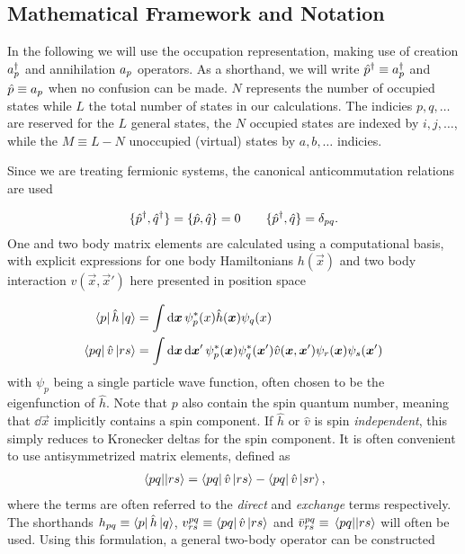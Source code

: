 \subsection{Mathematical Framework and Notation}
In the following we will use the occupation representation, making use of creation $a^{\dagger}_{p}$ and annihilation $a_{p}$ operators. As a shorthand, we will write $\hat{p}^{\dagger} \equiv a^{\dagger}_{p}$ and $\hat{p} \equiv a_{p}$ when no confusion can be made. $N$ represents the number of occupied states while $L$ the total number of states in our calculations. The indicies $p,q,\ldots$ are reserved for the $L$ general states, the $N$ occupied states are indexed by $i,j,\ldots$, while the $M \equiv L-N$ unoccupied (virtual) states by $a,b,\ldots$ indicies.

Since we are treating fermionic systems, the canonical anticommutation relations are used

\begin{align*}
    \set{\crt{p},\crt{q}} = \set{\ani{p},\ani{q}} = 0 \hspace{20px} \set{\crt{p},\ani{q}} = \delta_{pq}.
\end{align*}
One and two body matrix elements are calculated using a computational basis, with explicit expressions for one body Hamiltonians $h(\vec{x})$ and two body interaction $v(\vec{x}, \vec{x}')$ here presented in position space

\begin{align*}
    \bra{p}\hat{h}\ket{q} &= \int \dd{\boldsymbol{x}} \psi_p^*(x) \hat{h}(\boldsymbol{x}) \psi_q(x) \\
    \bra{pq}\hat{v}\ket{rs} &= \int \dd{\boldsymbol{x}}\dd{\boldsymbol{x}'} \psi_p^*(\boldsymbol{x})\psi_q^*(\boldsymbol{x}') \hat{v}(\boldsymbol{x},\boldsymbol{x}') \psi_r(\boldsymbol{x})\psi_s(\boldsymbol{x}')
\end{align*}
with $\psi_p$ being a single particle wave function, often chosen to be the eigenfunction of $\hat{h}$. Note that $p$ also contain the spin quantum number, meaning that $\dd \vec{x}$ implicitly contains a spin component. If $\hat{h}$ or $\hat{v}$ is spin \textit{independent}, this simply reduces to Kronecker deltas for the spin component. It is often convenient to use antisymmetrized matrix elements, defined as 
\begin{align*}
    \mel{pq}{}{rs} = \bra{pq}\hat{v}\ket{rs} - \bra{pq}\hat{v}\ket{sr},
\end{align*}
where the terms are often referred to the \textit{direct} and \textit{exchange} terms respectively. The shorthands $h_{pq} \equiv \bra{p} \hat{h} \ket{q}$, $v^{pq}_{rs} \equiv \bra{pq}\hat{v}\ket{rs}$ and $\bar{v}^{pq}_{rs} \equiv \mel{pq}{}{rs}$ will often be used. Using this formulation, a general two-body operator can be constructed

